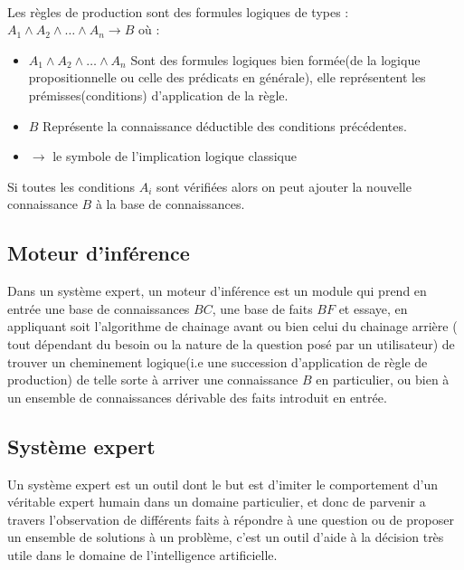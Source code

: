 \paragraph{}
Les règles de production sont des formules logiques de types : \\ $A_1 \land A_2 \land \dots \land A_n \rightarrow B$ où : 
\begin{itemize}
	\item $A_1 \land A_2 \land \dots \land A_n$ Sont des formules logiques bien formée(de la logique propositionnelle ou celle des prédicats en générale), elle représentent les prémisses(conditions) d'application de la règle.
	\item $B$ Représente la connaissance déductible des conditions précédentes.
	\item $\rightarrow$ le symbole de l'implication logique classique
\end{itemize}
Si toutes les conditions $A_i$ sont vérifiées alors on peut ajouter la nouvelle connaissance $B$ à la base de connaissances.
\subsection{Moteur d'inférence}
Dans un système expert, un moteur d'inférence est un module qui prend en entrée une base de connaissances $BC$, une base de faits $BF$ et essaye, en appliquant soit l'algorithme de chainage avant ou bien celui du chainage arrière ( tout dépendant du besoin ou la nature de la question posé par un utilisateur) de trouver un cheminement logique(i.e une succession d'application de règle de production) de telle sorte à arriver une connaissance $B$ en particulier, ou bien à un ensemble de connaissances dérivable des faits introduit en entrée.
\subsection{Système expert}
Un système expert est un outil dont le but est d'imiter le comportement d'un véritable expert humain dans un domaine particulier, et donc de parvenir a travers l'observation de différents faits à répondre à une question ou de proposer un ensemble de solutions à un problème, c'est un outil d'aide à la décision très utile dans le domaine de l'intelligence artificielle.